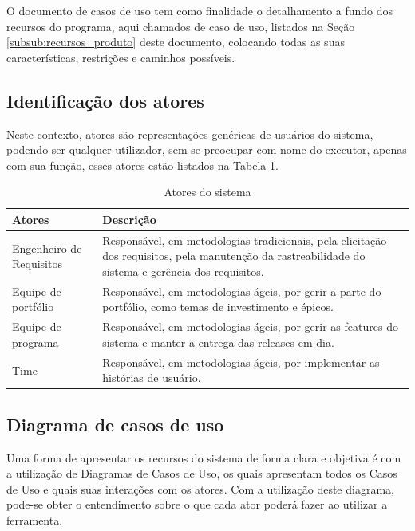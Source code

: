 
O documento de casos de uso tem como finalidade o detalhamento a fundo dos recursos do programa, aqui chamados de caso de uso, listados na Seção \ref{subsub:recursos_produto} deste documento, colocando todas as suas características, restrições e caminhos possíveis.

\subsection{Identificação dos atores}

Neste contexto, atores são representações genéricas de usuários do sistema, podendo ser qualquer utilizador, sem se preocupar com nome do executor, apenas com sua função, esses atores estão listados na Tabela \ref{tab:atores}.

\begin{table}[H]
\centering
\begin{tabular}{|l|p{8cm}|}

\hline
\textbf{Atores} &
\textbf{Descrição}
\\ \hline
Engenheiro de Requisitos &
Responsável, em metodologias tradicionais, pela elicitação dos requisitos, pela manutenção da rastreabilidade do sistema e gerência dos requisitos.
\\ \hline
Equipe de portfólio &
Responsável, em metodologias ágeis, por gerir a parte do portfólio, como temas de investimento e épicos.
\\ \hline
Equipe de programa &
Responsável, em metodologias ágeis, por gerir as features do sistema e manter a entrega das releases em dia.
\\ \hline
Time &
Responsável, em metodologias ágeis, por implementar as histórias de usuário.
\\ \hline

\end{tabular}
\caption{Atores do sistema}
\label{tab:atores}
\end{table}

\subsection{Diagrama de casos de uso}

Uma forma de apresentar os recursos do sistema de forma clara e objetiva é com a utilização de Diagramas de Casos de Uso, os quais apresentam todos os Casos de Uso e quais suas interações com os atores. Com a utilização deste diagrama, pode-se obter o entendimento sobre o que cada ator poderá fazer ao utilizar a ferramenta.

